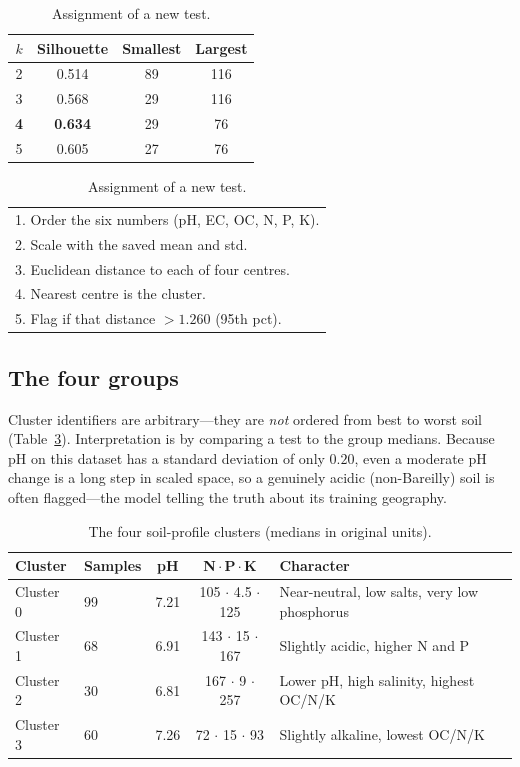 \documentclass[11pt,a4paper]{article}
\begin{document}
\begin{table}[h]
\centering\small
\begin{minipage}[t]{0.46\textwidth}
\centering
\caption{Silhouette search over $k$.}
\label{tab:sil}
\begin{tabular}{cccc}
\toprule
$k$ & Silhouette & Smallest & Largest\\
\midrule
2 & 0.514 & 89 & 116\\
3 & 0.568 & 29 & 116\\
\textbf{4} & \textbf{0.634} & 29 & 76\\
5 & 0.605 & 27 & 76\\
\bottomrule
\end{tabular}
\end{minipage}\hfill
\begin{minipage}[t]{0.5\textwidth}
\centering
\caption{Assignment of a new test.}
\label{tab:soilsteps}
\begin{tabular}{p{7.4cm}}
\toprule
1. Order the six numbers (pH, EC, OC, N, P, K).\\
2. Scale with the saved mean and std.\\
3. Euclidean distance to each of four centres.\\
4. Nearest centre is the cluster.\\
5. Flag if that distance $>1.260$ (95th pct).\\
\bottomrule
\end{tabular}
\end{minipage}
\end{table}

\subsection{The four groups}
Cluster identifiers are arbitrary---they are \emph{not} ordered from best to worst soil
(Table~\ref{tab:clusters}). Interpretation is by comparing a test to the group medians. Because pH
on this dataset has a standard deviation of only $0.20$, even a moderate pH change is a long step in
scaled space, so a genuinely acidic (non-Bareilly) soil is often flagged---the model telling the
truth about its training geography.

\begin{table}[h]
\centering\small
\caption{The four soil-profile clusters (medians in original units).}
\label{tab:clusters}
\begin{tabular}{llccl}
\toprule
\textbf{Cluster} & \textbf{Samples} & \textbf{pH} & \textbf{N\,$\cdot$\,P\,$\cdot$\,K} & \textbf{Character}\\
\midrule
Cluster 0 & 99 & 7.21 & 105 $\cdot$ 4.5 $\cdot$ 125 & Near-neutral, low salts, very low phosphorus\\
Cluster 1 & 68 & 6.91 & 143 $\cdot$ 15 $\cdot$ 167 & Slightly acidic, higher N and P\\
Cluster 2 & 30 & 6.81 & 167 $\cdot$ 9 $\cdot$ 257 & Lower pH, high salinity, highest OC/N/K\\
Cluster 3 & 60 & 7.26 & 72 $\cdot$ 15 $\cdot$ 93 & Slightly alkaline, lowest OC/N/K\\
\bottomrule
\end{tabular}
\end{table}
\end{document}
